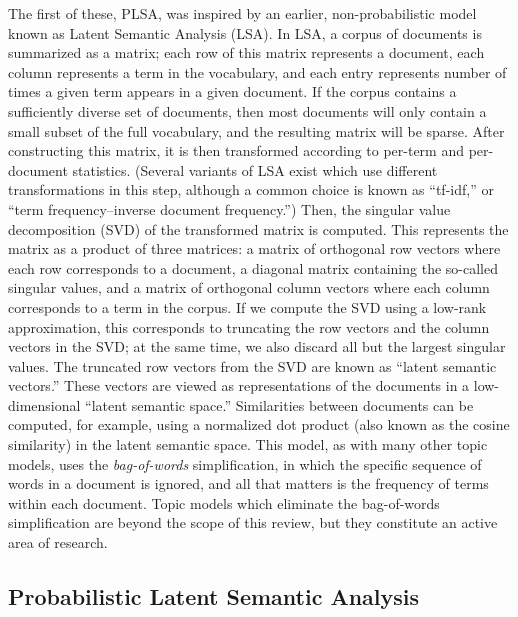 \documentclass{article}
\begin{document}
The first of these, PLSA, was inspired by an earlier, non-probabilistic model known as Latent Semantic Analysis (LSA).
In LSA, a corpus of documents is summarized as a matrix; each row of this matrix represents a document, each column represents a term in the vocabulary, and each entry represents number of times a given term appears in a given document.
If the corpus contains a sufficiently diverse set of documents, then most documents will only contain a small subset of the full vocabulary, and the resulting matrix will be sparse.
After constructing this matrix, it is then transformed according to per-term and per-document statistics.
(Several variants of LSA exist which use different transformations in this step, although a common choice is known as ``tf-idf,'' or ``term frequency--inverse document frequency.'')
Then, the singular value decomposition (SVD) of the transformed matrix is computed.
This represents the matrix as a product of three matrices: a matrix of orthogonal row vectors where each row corresponds to a document, a diagonal matrix containing the so-called singular values, and a matrix of orthogonal column vectors where each column corresponds to a term in the corpus.
If we compute the SVD using a low-rank approximation, this corresponds to truncating the row vectors and the column vectors in the SVD; at the same time, we also discard all but the largest singular values.
The truncated row vectors from the SVD are known as ``latent semantic vectors.''
These vectors are viewed as representations of the documents in a low-dimensional ``latent semantic space.''
Similarities between documents can be computed, for example, using a normalized dot product (also known as the cosine similarity) in the latent semantic space.
This model, as with many other topic models, uses the \emph{bag-of-words} simplification, in which the specific sequence of words in a document is ignored, and all that matters is the frequency of terms within each document.
Topic models which eliminate the bag-of-words simplification are beyond the scope of this review, but they constitute an active area of research.

\subsection{Probabilistic Latent Semantic Analysis}
\end{document}
